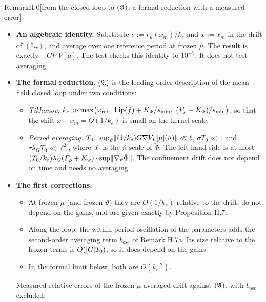 \begin{rmk}{Remark}{H.0}[from the closed loop to $(\mathfrak{A})$: a formal reduction with a measured error]
\leavevmode
\begin{itemize}
  \item \textbf{An algebraic identity.} Substitute $e := r_\mu(x_m)/k_e$ and $x := x_m$ in the drift of
  $(\mathrm{L}_\tau)$, and average over one reference period at frozen $\mu$. The result is exactly $-G\nabla V[\mu]$.
  The test  checks this identity to $10^{-7}$. It does not
  test averaging.
  \item \textbf{The formal reduction.} $(\mathfrak{A})$ is the leading-order description of the mean-field closed loop under
  two conditions:
  \begin{itemize}
    \item \emph{Tikhonov:}
    $k_e \gg \max\bigl(\omega_{\mathrm{ref}},\ \operatorname{Lip}(f) + K_\Phi/s_{\min},\ (F_\rho + K_\Phi)/s_{\min}\bigr)$, so that
    the shift $x - x_m = O(1/k_e)$ is small on the kernel scale.
    \item \emph{Period averaging:}
    $T_0\cdot\sup_\vartheta\lVert (1/k_e)G\nabla V_L[\mu](\vartheta)\rVert \ll \ell$, $\sigma T_0 \ll 1$ and
    $\tau\lambda_G T_0 \ll \ell^2$, where $\ell$ is the $\vartheta$-scale of $\tilde\Phi$. The left-hand side is at most
    $(T_0/k_e)\lambda_G(F_\rho + K_\Phi)\cdot\sup\lVert \nabla_\vartheta\tilde\Phi\rVert$. The confinement drift does not
    depend on time and needs no averaging.
  \end{itemize}
  \item \textbf{The first corrections.}
  \begin{itemize}
    \item At frozen $\mu$ (and frozen $\vartheta$) they are $O(1/k_e)$ relative to the drift, do not depend on the
    gains, and are given exactly by Proposition H.7.
    \item Along the loop, the within-period oscillation of the parameters adds the second-order averaging term
    $b_{\mathrm{osc}}$ of Remark H.7a. Its size relative to the frozen terms is $O(\lvert G\rvert T_0)$, so it does depend on
    the gains.
    \item In the formal limit below, both are $O(k_e^{-2})$.
  \end{itemize}
  Measured relative errors of the frozen-$\mu$ averaged drift against $(\mathfrak{A})$, with $b_{\mathrm{osc}}$ excluded:
  \begin{center}
    \small
    \begin{tabular}{lccccc}

\end{tabular}
\end{center}
\end{itemize}
\end{rmk}
